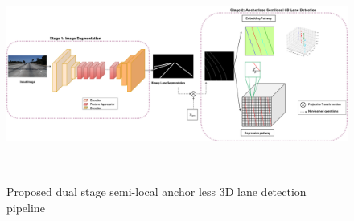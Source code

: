         \begin{figure}[h]
    \centering
    \includegraphics[width=\textwidth, height=7cm]{images/3DlaneAUXNet.png}
    \caption{Proposed dual stage semi-local anchor less 3D lane detection pipeline  \cite{guo2020gen}}
    \end{figure}
        
